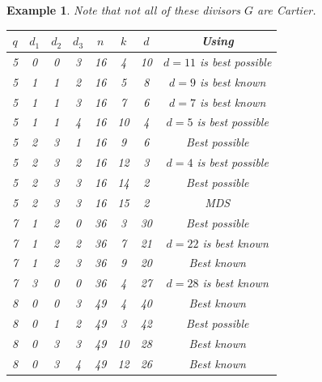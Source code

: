 \documentclass[12pt]{article}
\newtheorem{example}[theorem]{Example}
\begin{document}
\begin{example}
Note that not all of these
divisors $G$ are Cartier. 

\begin{center}
\begin{tabular}{|c|c|c|c|c|c|c|c|}\hline
$q$ & $d_1$ & $d_2$ & $d_3$ & $n$ & $k$ & $d$ & Using \cite{B} \\ \hline
 5   &  0     &  0     &  3     &  16   &  4   &  10  & $d=11$ is best possible \\
 5   &  1     &  1     &  2     &  16   &  5   &  8  & $d=9$ is best known \\
 5   &  1     &  1     &  3     &  16   &  7   &  6  &$d=7$ is best known  \\
 5   &  1     &  1     &  4     &  16   &  10   &  4  & $d=5$ is best possible \\
 5   &  2     &  3     &  1     &  16   &  9   &  6   &Best possible   \\
 5   &  2     &  3     &  2     &  16   &  12   &  3  & $d=4$ is best possible \\
 5   &  2     &  3     &  3     &  16   &  14   &  2  & Best possible   \\
 5   &  2     &  3     &  3     &  16   &  15   &  2   & MDS\\

 7   &  1     &  2     &  0     &  36   &   3  &  30 & Best possible   \\
 7   &  1     &  2     &  2     &  36   &   7  &  21 & $d=22$ is best known  \\
 7   &  1     &  2     &  3     &  36   &   9  &  20 & Best known  \\
 7   &  3     &  0     &  0     &  36   &   4  &  27 & $d=28$ is best known  \\
8   &  0  &  0  &  3  &  49  &  4  &  40  & Best known \\
8   &  0  &  1  &  2  &  49  &  3  &  42  & Best possible \\
8   &  0  &  3  &  3  &  49  &  10  &  28  & Best known \\
8   &  0  &  3  &  4  &  49  &  12  &  26  & Best known \\

\hline
\end{tabular}

\end{center}

\end{example}
\end{document}
